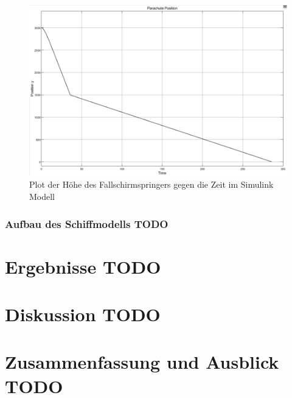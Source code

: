 \documentclass[]{iat}
\begin{document}
\begin{figure}[H]
    \includegraphics[width=\textwidth]{graphics/simulink_parachute_s_plot.png}
    \centering
    \caption{Plot der Höhe des Fallschirmspringers gegen die Zeit im Simulink Modell}
    \label{fig:simulink_parachute_s_plot}
\end{figure}

\subsection{Aufbau des Schiffmodells TODO} \label{sec:aufbau_schiffsmodell}

\chapter{Ergebnisse TODO} \label{sec:ergebnisse}

\chapter{Diskussion TODO} \label{sec:diskussion}

\chapter{Zusammenfassung und Ausblick TODO} \label{sec:zsmfassung_ausblick}


\printbibliography
\end{document}
